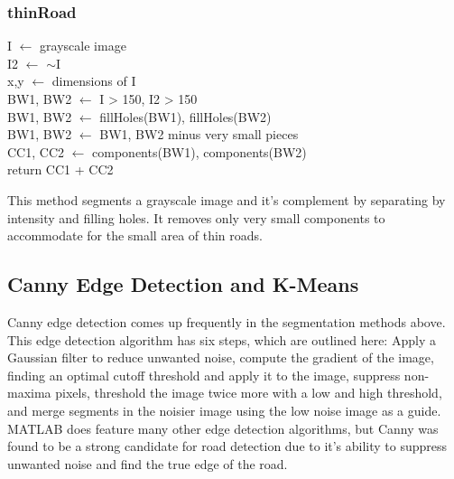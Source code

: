 \documentclass[12pt]{article}
\begin{document}
\subsubsection*{thinRoad}
\begin{addmargin}[12em]{1em}
	I $\leftarrow$ grayscale image \\
	I2 $\leftarrow$ $\sim$I \\
	x,y $\leftarrow$ dimensions of I \\
	BW1, BW2 $\leftarrow$ I > 150, I2 > 150 \\
	BW1, BW2 $\leftarrow$ fillHoles(BW1), fillHoles(BW2) \\
	BW1, BW2 $\leftarrow$ BW1, BW2 minus very small pieces \\
	CC1, CC2 $\leftarrow$ components(BW1), components(BW2) \\
	return CC1 + CC2 \\
\end{addmargin}
This method segments a grayscale image and it's complement by separating by intensity and filling holes. It removes only very small components to accommodate for the small area of thin roads.


\subsection*{Canny Edge Detection and K-Means}
Canny edge detection comes up frequently in the segmentation methods above. This edge detection algorithm has six steps, which are outlined here: Apply a Gaussian filter to reduce unwanted noise, compute the gradient of the image, finding an optimal cutoff threshold and apply it to the image, suppress non-maxima pixels, threshold the image twice more with a low and high threshold, and merge segments in the noisier image using the low noise image as a guide. MATLAB does feature many other edge detection algorithms, but Canny was found to be a strong candidate for road detection due to it's ability to suppress unwanted noise and find the true edge of the road. 
\end{document}
